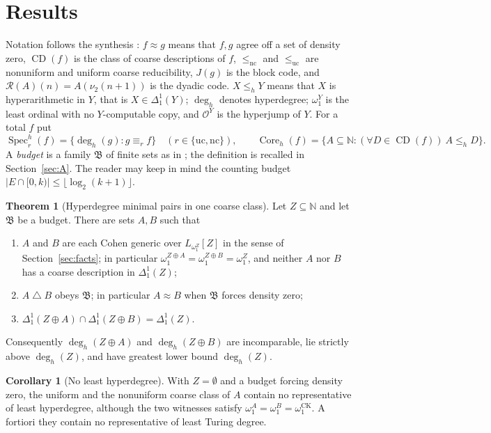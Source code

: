 \documentclass[11pt,letterpaper]{article}
\theoremstyle{definition}
\newtheorem{theorem}[definition]{Theorem}
\newtheorem{corollary}[definition]{Corollary}
\numberwithin{equation}{section}
\newcommand{\N}{\mathbb N}
\newcommand{\lenc}{\le_{\mathrm{nc}}}
\newcommand{\leuc}{\le_{\mathrm{uc}}}
\newcommand{\nc}{\mathrm{nc}}
\newcommand{\uc}{\mathrm{uc}}
\newcommand{\CD}{\operatorname{CD}}
\newcommand{\J}{J}
\newcommand{\Rc}{\mathcal R}
\newcommand{\sd}{\mathbin{\triangle}}
\newcommand{\bud}{\mathfrak B}
\newcommand{\leh}{\le_{h}}
\newcommand{\Dh}{\Delta^1_1}
\newcommand{\Coreh}{\operatorname{Core}_h}
\newcommand{\Spech}{\operatorname{Spec}^h}
\newcommand{\degh}{\deg_h}
\newcommand{\omck}{\omega_1^{\mathrm{CK}}}
\newcommand{\KO}{\mathcal O}
\begin{document}
\section{Results}\label{sec:results}
Notation follows the synthesis \cite{Synthesis}: $f\approx g$ means that $f,g$ agree off a set of density zero, $\CD(f)$ is the class of coarse descriptions of $f$, $\lenc$ and $\leuc$ are nonuniform and uniform coarse reducibility, $\J(g)$ is the block code, and $\Rc(A)(n)=A(\nu_2(n+1))$ is the dyadic code. $X\leh Y$ means that $X$ is hyperarithmetic in $Y$, that is $X\in\Dh(Y)$; $\degh$ denotes hyperdegree; $\omega_1^Y$ is the least ordinal with no $Y$-computable copy, and $\KO^Y$ is the hyperjump of $Y$. For a total $f$ put
\[
 \Spech_r(f)=\{\degh(g):g\equiv_r f\}\quad(r\in\{\uc,\nc\}),\qquad
 \Coreh(f)=\{A\subseteq\N:(\forall D\in\CD(f))\ A\leh D\}.
\]
A \emph{budget} is a family $\bud$ of finite sets as in \cite[Definition~8.1]{Synthesis}; the definition is recalled in Section~\ref{sec:A}. The reader may keep in mind the counting budget $|E\cap[0,k)|\le\lfloor\log_2(k+1)\rfloor$.

\begin{theorem}[Hyperdegree minimal pairs in one coarse class]\label{thm:A}
Let $Z\subseteq\N$ and let $\bud$ be a budget. There are sets $A,B$ such that
\begin{enumerate}[label=\textup{(\roman*)}]
\item $A$ and $B$ are each Cohen generic over $L_{\omega_1^Z}[Z]$ in the sense of Section~\ref{sec:facts}; in particular $\omega_1^{Z\oplus A}=\omega_1^{Z\oplus B}=\omega_1^Z$, and neither $A$ nor $B$ has a coarse description in $\Dh(Z)$;
\item $A\sd B$ obeys $\bud$; in particular $A\approx B$ when $\bud$ forces density zero;
\item $\Dh(Z\oplus A)\cap\Dh(Z\oplus B)=\Dh(Z)$.
\end{enumerate}
Consequently $\degh(Z\oplus A)$ and $\degh(Z\oplus B)$ are incomparable, lie strictly above $\degh(Z)$, and have greatest lower bound $\degh(Z)$.
\end{theorem}

\begin{corollary}[No least hyperdegree]\label{cor:noleast}
With $Z=\emptyset$ and a budget forcing density zero, the uniform and the nonuniform coarse class of $A$ contain no representative of least hyperdegree, although the two witnesses satisfy $\omega_1^A=\omega_1^B=\omck$. A fortiori they contain no representative of least Turing degree.
\end{corollary}
\end{document}
